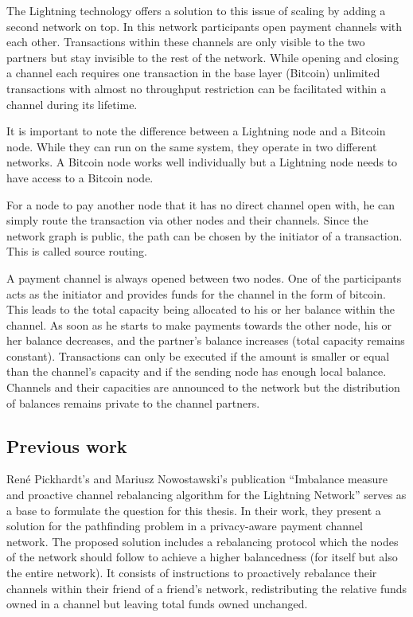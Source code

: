 \documentclass[draft]{fhnwreport}       %
\begin{document}
The Lightning technology offers a solution to this issue of scaling by adding a second network on top. In this network participants open payment channels with each other. Transactions within these channels are only visible to the two partners but stay invisible to the rest of the network. While opening and closing a channel each requires one transaction in the base layer (Bitcoin) unlimited transactions with almost no throughput restriction can be facilitated within a channel during its lifetime. 

It is important to note the difference between a Lightning node and a Bitcoin node. While they can run on the same system, they operate in two different networks. A Bitcoin node works well individually but a Lightning node needs to have access to a Bitcoin node.

For a node to pay another node that it has no direct channel open with, he can simply route the transaction via other nodes and their channels. Since the network graph is public, the path can be chosen by the initiator of a transaction. This is called source routing. 

A payment channel is always opened between two nodes. One of the participants acts as the initiator and provides funds for the channel in the form of bitcoin. This leads to the total capacity being allocated to his or her balance within the channel. As soon as he starts to make payments towards the other node, his or her balance decreases, and the partner's balance increases (total capacity remains constant). Transactions can only be executed if the amount is smaller or equal than the channel's capacity and if the sending node has enough local balance. Channels and their capacities are announced to the network but the distribution of balances remains private to the channel partners.

\subsection{Previous work}
René Pickhardt's and Mariusz Nowostawski's publication ``Imbalance measure and proactive channel rebalancing algorithm for the Lightning Network'' \cite{pickhardt_imbalance_2019} serves as a base to formulate the question for this thesis. In their work, they present a solution for the pathfinding problem in a privacy-aware payment channel network. The proposed solution includes a rebalancing protocol which the nodes of the network should follow to achieve a higher balancedness (for itself but also the entire network). It consists of instructions to proactively rebalance their channels within their friend of a friend's network, redistributing the relative funds owned in a channel but leaving total funds owned unchanged.
\end{document}
